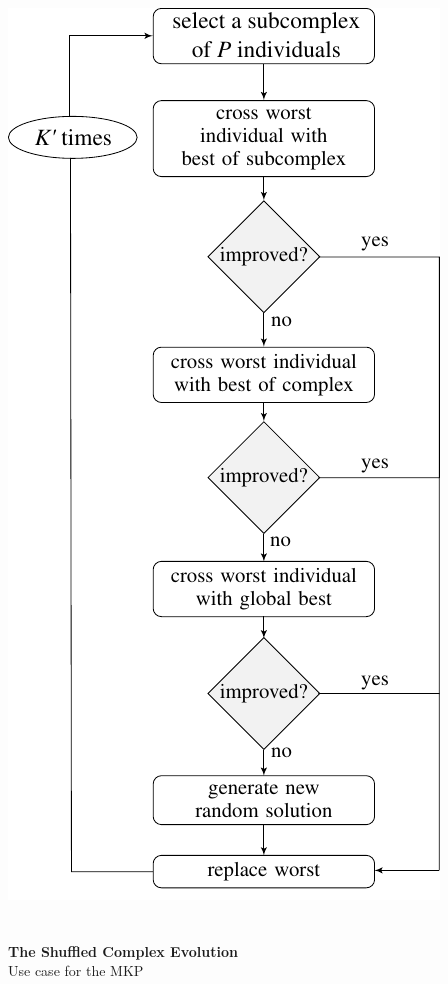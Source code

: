 \begin{frame}
\begin{columns}
\begin{column}{0.25\textwidth}
  \vspace{10pt}\hspace{-18pt}\includegraphics[scale=0.45]{img/sce/flow2}
\end{column}
\end{columns}
\end{frame}

%
\begin{frame}
\frametitle{}
\begin{center}
  \textbf{\Large The Shuffled Complex Evolution}
  \\ \bigskip \bigskip
  {\large Use case for the MKP}
\end{center}
\end{frame}

